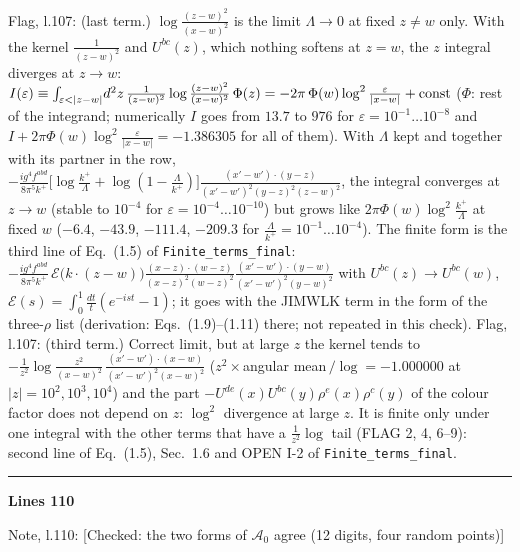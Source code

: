 \documentclass[10pt]{article}
\newenvironment{notebox}{\def\FrameCommand{{\color{notebar}\vrule width 1.5pt}\hspace{6pt}}\MakeFramed{\advance\hsize-\width\FrameRestore}\small}{\endMakeFramed}
\begin{document}
\begin{notebox}\textsf{\small Flag, l.107:}  (last term.) $\log\frac{(z-w)^{2}}{(x-w)^{2}}$ is the limit $\Lambda\to0$ at fixed $z\neq w$ only. With the kernel $\frac{1}{(z-w)^{2}}$ and $U^{bc}(z)$, which nothing softens at $z=w$, the $z$ integral diverges at $z\to w$: $I(\varepsilon)\equiv\int_{\varepsilon<|z-w|}\!d^{2}z\,\frac{1}{(z-w)^{2}}\log\frac{(z-w)^{2}}{(x-w)^{2}}\,\Phi(z)=-2\pi\,\Phi(w)\log^{2}\frac{\varepsilon}{|x-w|}+{\rm const}$ ($\Phi$: rest of the integrand; numerically $I$ goes from $13.7$ to $976$ for $\varepsilon=10^{-1}\dots10^{-8}$ and $I+2\pi\Phi(w)\log^{2}\frac{\varepsilon}{|x-w|}=-1.386305$ for all of them). With $\Lambda$ kept and together with its partner in the row, $-\frac{ig^{4}f^{abd}}{8\pi^{5}k^{+}}\big[\log\frac{k^{+}}{\Lambda}+\log(1-\frac{\Lambda}{k^{+}})\big]\frac{(x'-w')\cdot(y-z)}{(x'-w')^{2}(y-z)^{2}(z-w)^{2}}$, the integral converges at $z\to w$ (stable to $10^{-4}$ for $\varepsilon=10^{-4}\dots10^{-10}$) but grows like $2\pi\Phi(w)\log^{2}\frac{k^{+}}{\Lambda}$ at fixed $w$ ($-6.4$, $-43.9$, $-111.4$, $-209.3$ for $\frac{\Lambda}{k^{+}}=10^{-1}\dots10^{-4}$). The finite form is the third line of Eq.~(1.5) of \texttt{Finite\_terms\_final}: $-\frac{ig^{4}f^{abd}}{8\pi^{5}k^{+}}\,\mathcal{E}\big(k\cdot(z-w)\big)\frac{(x-z)\cdot(w-z)}{(x-z)^{2}(w-z)^{2}}\frac{(x'-w')\cdot(y-w)}{(x'-w')^{2}(y-w)^{2}}$ with $U^{bc}(z)\to U^{bc}(w)$, $\mathcal{E}(s)=\int_{0}^{1}\frac{dt}{t}(e^{-ist}-1)$; it goes with the JIMWLK term in the form of the three-$\rho$ list (derivation: Eqs.~(1.9)--(1.11) there; not repeated in this check).\end{notebox}
\begin{notebox}\textsf{\small Flag, l.107:}  (third term.) Correct limit, but at large $z$ the kernel tends to $-\frac{1}{z^{2}}\log\frac{z^{2}}{(x-w)^{2}}\,\frac{(x'-w')\cdot(x-w)}{(x'-w')^{2}(x-w)^{2}}$ ($z^{2}\times$angular mean$\,/\log=-1.000000$ at $|z|=10^{2},10^{3},10^{4}$) and the part $-U^{de}(x)U^{bc}(y)\rho^{e}(x)\rho^{c}(y)$ of the colour factor does not depend on $z$: $\log^{2}$ divergence at large $z$. It is finite only under one integral with the other terms that have a $\frac{1}{z^{2}}\log$ tail (FLAG 2, 4, 6--9): second line of Eq.~(1.5), Sec.~1.6 and OPEN I-2 of \texttt{Finite\_terms\_final}.\end{notebox}
\noindent\rule{\linewidth}{0.3pt}\par\noindent\textbf{Lines 110}\par
\begin{notebox}\textsf{\small Note, l.110:} [Checked: the two forms of $\mathcal{A}_{0}$ agree (12 digits, four random points)]\end{notebox}
\end{document}
